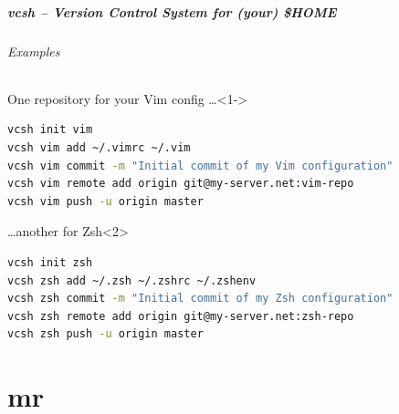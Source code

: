 \documentclass[english,hyperref={pdfpagelabels=false},aspectratio=1610]{beamer}
\begin{document}
\begin{frame}[fragile]
  \frametitle{vcsh -- Version Control System for (your) \$HOME}
  \framesubtitle{Examples}
  \begin{block}{One repository for your Vim config \dots}<1->
    \vspace{-0.75em}
    \begin{lstlisting}[language=zsh]
vcsh init vim
vcsh vim add ~/.vimrc ~/.vim
vcsh vim commit -m "Initial commit of my Vim configuration"
vcsh vim remote add origin git@my-server.net:vim-repo
vcsh vim push -u origin master
    \end{lstlisting}
    \vspace{-0.75em}
  \end{block}
  \begin{block}{\dots another for Zsh}<2>
    \vspace{-0.75em}
    \begin{lstlisting}[language=zsh]
vcsh init zsh
vcsh zsh add ~/.zsh ~/.zshrc ~/.zshenv
vcsh zsh commit -m "Initial commit of my Zsh configuration"
vcsh zsh remote add origin git@my-server.net:zsh-repo
vcsh zsh push -u origin master
    \end{lstlisting}
    \vspace{-0.75em}
  \end{block}
\end{frame}


\part{mr}
\makepart
\end{document}
